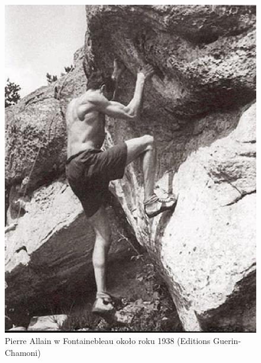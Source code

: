 \documentclass{article}
\begin{document}
\begin{figure}[!htbp]
	\begin{center}
		\includegraphics[width=0.7\linewidth]{images/allain-1.eps}
	\end{center}
	\caption{Pierre Allain w Fontainebleau około roku 1938 (Editions Guerin-Chamoni) \cite{gill-history2}}
	\label{allain-1}
\end{figure}
\end{document}
